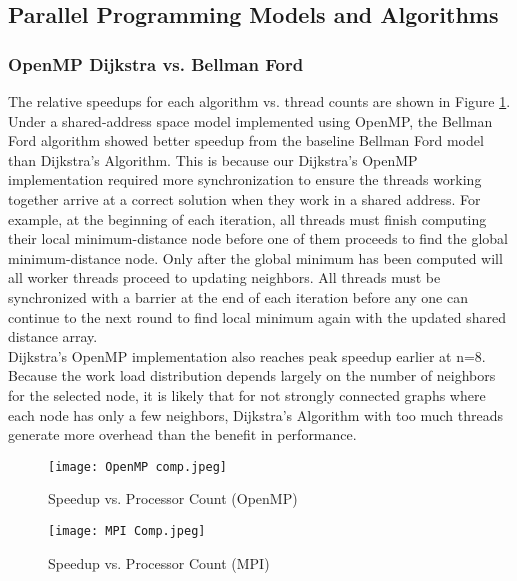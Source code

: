 \documentclass[12pt]{article}
\begin{document}
\subsection{Parallel Programming Models and Algorithms}
\subsubsection{OpenMP Dijkstra vs. Bellman Ford}
The relative speedups for each algorithm vs. thread counts are shown in Figure \ref{fig:openmp}. Under a shared-address space model implemented using OpenMP, the Bellman Ford algorithm showed better speedup from the baseline Bellman Ford model than Dijkstra's Algorithm. This is because our Dijkstra's OpenMP implementation required more synchronization to ensure the threads working together arrive at a correct solution when they work in a shared address. For example, at the beginning of each iteration, all threads must finish computing their local minimum-distance node before one of them proceeds to find the global minimum-distance node. Only after the global minimum has been computed will all worker threads proceed to updating neighbors. All threads must be synchronized with a barrier at the end of each iteration before any one can continue to the next round to find local minimum again with the updated shared distance array. 
\\Dijkstra's OpenMP implementation also reaches peak speedup earlier at n=8. Because the work load distribution depends largely on the number of neighbors for the selected node, it is likely that for not strongly connected graphs where each node has only a few neighbors, Dijkstra's Algorithm with too much threads generate more overhead than the benefit in performance.
\begin{figure}[hbt!]
\begin{center}
  \texttt{[image: OpenMP comp.jpeg]}
  \caption{Speedup vs. Processor Count (OpenMP)}
  \label{fig:openmp}
  \end{center}
\end{figure}

\begin{figure}[hbt!]
\begin{center}
  \texttt{[image: MPI Comp.jpeg]}
  \caption{Speedup vs. Processor Count (MPI)}
  \label{fig:mpi}
  \end{center}
\end{figure}
\end{document}
